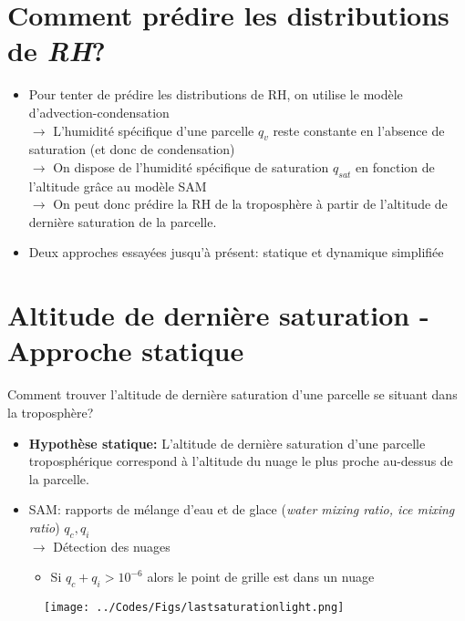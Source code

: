 \documentclass[10pt]{beamer}
\begin{document}
\section*{Comment prédire les distributions de \textit{RH}?}
\begin{frame}{\secname}
     \begin{itemize}
         \item Pour tenter de prédire les distributions de RH, on utilise le modèle d'advection-condensation \autocite{pierrehumbertRelativeHumidityAtmosphere2007,Vallis2017} \\ \vspace{0.2cm}
         $\rightarrow$ L'humidité spécifique d'une parcelle $q_v$ reste constante en l'absence de saturation (et donc de condensation) \\ \vspace{0.2cm}
         $\rightarrow$ On dispose de l'humidité spécifique de saturation $q_{sat}$ en fonction de l'altitude grâce au modèle SAM  \\ \vspace{0.2cm}
         $\rightarrow$ On peut donc prédire la RH de la troposphère à partir de l'altitude de dernière saturation de la parcelle. 
         \item Deux approches essayées jusqu'à présent: statique et dynamique simplifiée 
     \end{itemize}
\end{frame}

\section*{Altitude de dernière saturation - Approche statique}
\begin{frame}{\secname}
    Comment trouver l'altitude de dernière saturation d'une parcelle se situant dans la troposphère?
    \begin{itemize}
        \item \textbf{Hypothèse statique:} L'altitude de dernière saturation d'une parcelle troposphérique correspond à l'altitude du nuage le plus proche au-dessus de la parcelle.
        \item SAM: rapports de mélange d'eau et de glace (\textit{water mixing ratio, ice mixing ratio}) $q_c, q_i$ \\ 
        $\rightarrow$ Détection des nuages
        \begin{itemize}
            \item Si $q_c + q_i > 10^{-6}$ alors le point de grille est dans un nuage \autocite{Risi2021}
        \end{itemize}
    \end{itemize}
    \begin{figure}[hbtp]
        \centering
        \texttt{[image: ../Codes/Figs/lastsaturationlight.png]}
    \end{figure}
\end{frame}
\end{document}
